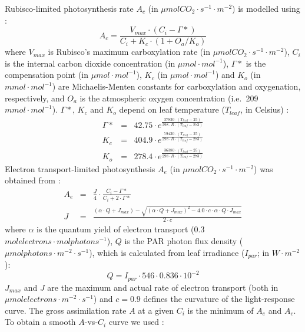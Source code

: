 \documentclass[]{book}
\begin{document}
Rubisco-limited photosynthesis rate \(A_c\) (in \(\mu mol CO_2 \cdot s^{-1} \cdot m^{-2}\)) is modelled using \citep{Collatz1991, Medlyn2002}:
\begin{equation}
A_c=\frac{V_{max}\cdot (C_i- \Gamma*)}{C_i+K_c \cdot (1+ O_a/K_o)}
\end{equation}
where \(V_{max}\) is Rubisco's maximum carboxylation rate (in \(\mu mol CO_2 \cdot s^{-1} \cdot m^{-2}\)), \(C_i\) is the internal carbon dioxide concentration (in \(\mu mol \cdot mol^{-1}\)), \(\Gamma*\) is the compensation point (in \(\mu mol \cdot mol^{-1}\)), \(K_c\) (in \(\mu mol \cdot mol^{-1}\)) and \(K_o\) (in \(mmol \cdot mol^{-1}\)) are Michaelis-Menten constants for carboxylation and oxygenation, respectively, and \(O_a\) is the atmospheric oxygen concentration (i.e.~209 \(mmol \cdot mol^{-1}\)). \(\Gamma*\), \(K_c\) and \(K_o\) depend on leaf temperature (\(T_{leaf}\), in Celsius) \citep{Bernacchi2001}:
\begin{eqnarray}
\Gamma* &=& 42.75\cdot e^{\frac{37830\cdot (T_{leaf}-25)}{298\cdot R \cdot (T_{leaf}-273)}}\\
K_c &=& 404.9\cdot e^{\frac{79430\cdot (T_{leaf}-25)}{298\cdot R \cdot (T_{leaf}-273)}}\\
K_o &=& 278.4\cdot e^{\frac{36380\cdot (T_{leaf}-25)}{298\cdot R \cdot (T_{leaf}-273)}}
\end{eqnarray}
Electron transport-limited photosynthesis \(A_e\) (in \(\mu mol CO_2 \cdot s^{-1} \cdot m^{-2}\)) was obtained from \citet{Medlyn2002}:
\begin{eqnarray}
A_e &=& \frac{J}{4}\cdot \frac{C_i-\Gamma*}{C_i+2\cdot \Gamma*} \\
J &=& \frac{(\alpha\cdot Q + J_{max})-\sqrt{(\alpha\cdot Q + J_{max})^2-4.0\cdot c \cdot \alpha \cdot Q \cdot J_{max}}}{2\cdot c}
\end{eqnarray}
where \(\alpha\) is the quantum yield of electron transport (0.3 \(mol electrons \cdot mol photons^{-1}\)), \(Q\) is the PAR photon flux density (\(\mu mol photons \cdot m^{-2} \cdot s^{-1}\)), which is calculated from leaf irradiance (\(I_{par}\); in \(W \cdot m^{-2}\)):
\begin{equation}
Q = I_{par}\cdot 546 \cdot 0.836\cdot 10^{-2}
\end{equation}
\(J_{max}\) and \(J\) are the maximum and actual rate of electron transport (both in \(\mu mol electrons \cdot m^{-2} \cdot s^{-1}\)) and \(c=0.9\) defines the curvature of the light-response curve. The gross assimilation rate \(A\) at a given \(C_i\) is the minimum of \(A_e\) and \(A_c\). To obtain a smooth \(A\)-vs-\(C_i\) curve we used \citep{Collatz1991}:
\end{document}
